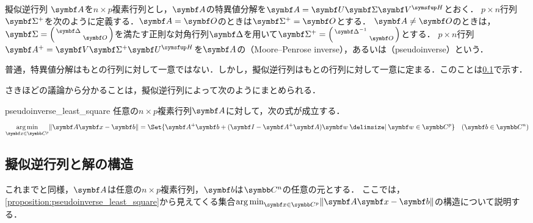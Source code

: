 \documentclass[../../main]{subfiles}
\begin{document}
\begin{definition}{擬似逆行列}{}
  \(\mat{A}\)を\(n\times p\)複素行列とし，\(\mat{A}\)の特異値分解を\(\mat{A}=\mat{U}\mat{\Sigma}\htrps{\mat{V}}\)とおく．
  \(p\times n\)行列\(\pinv{\mat{\Sigma}}\)を次のように定義する．\(\mat{A}=\zmat\)のときは\(\pinv{\mat{\Sigma}}=\zmat\)とする．
  \(\mat{A}\neq\zmat\)のときは，\(\mat{\Sigma}=\smallmatrice{\mat{\Delta} & \\ & \zmat}\)を満たす正則な対角行列\(\mat{\Delta}\)を用いて\(\pinv{\mat{\Sigma}}=\smallmatrice{\mat{\Delta}^{-1} & \\ & \zmat}\)とする．
  \(p\times n\)行列\(\pinv{\mat{A}}=\mat{V}\pinv{\mat{\Sigma}}\htrps{\mat{U}}\)を\(\mat{A}\)の（Moore–Penrose inverse），あるいは（pseudoinverse）という．
\end{definition}

\begin{note}
  普通，特異値分解はもとの行列に対して一意ではない．しかし，擬似逆行列はもとの行列に対して一意に定まる．このことは\cref{subsection:pseudoinverse}で示す．
\end{note}

さきほどの議論から分かることは，擬似逆行列によって次のようにまとめられる．

\begin{proposition}{}{pseudoinverse_least_square}
  任意の\(n\times p\)複素行列\(\mat{A}\)に対して，次の式が成立する．
  \[
    \argmin_{\vect{x}\in\numset{C}^p}\vnorm{\mat{A}\vect{x}-\vect{b}} = \Set{\pinv{\mat{A}}\vect{b}+(\imat-\pinv{\mat{A}}\mat{A})\vect{w}\given\vect{w}\in\numset{C}^p}\quad(\vect{b}\in\numset{C}^n)
  \]
\end{proposition}

\subsection{擬似逆行列と解の構造}
\label{subsection:pseudoinverse}

これまでと同様，\(\mat{A}\)は任意の\(n\times p\)複素行列，\(\vect{b}\)は\(\numset{C}^n\)の任意の元とする．
ここでは，\cref{proposition:pseudoinverse_least_square}から見えてくる集合\(\argmin_{\vect{x}\in\numset{C}^p}\vnorm{\mat{A}\vect{x}-\vect{b}}\)の構造について説明する．
\end{document}
